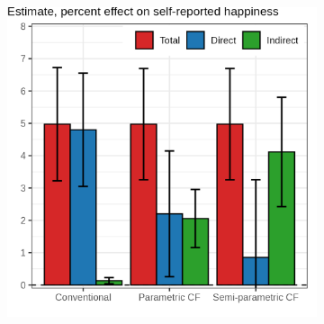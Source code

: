 \documentclass[dvipsnames]{beamer} %
\begin{document}
\begin{frame}
{{\begin{figure}
\begin{subfigure}[c]{0.525\textwidth}
                \includegraphics[width=\textwidth]{
                    ../text/sections/figures/mediation-happy.png}
            \end{subfigure}
        \end{figure}
    }}
\end{frame}
\end{document}
